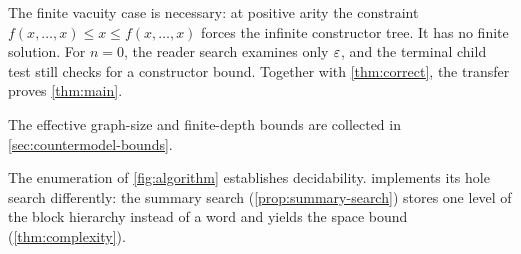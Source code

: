 The finite vacuity case is necessary: at positive arity the constraint
$f(x,\ldots,x)\le x\le f(x,\ldots,x)$ forces the infinite constructor
tree. It has no finite solution. For $n=0$, the reader search examines only
$\varepsilon$, and the terminal child test still checks for a constructor bound.
Together with \cref{thm:correct}, the transfer proves \cref{thm:main}.

The effective graph-size and finite-depth bounds are collected in
\cref{sec:countermodel-bounds}.

The enumeration of \cref{fig:algorithm} establishes decidability.
 implements its hole search differently: the summary
search (\cref{prop:summary-search}) stores one level of the block hierarchy
instead of a word and yields the space bound (\cref{thm:complexity}).
